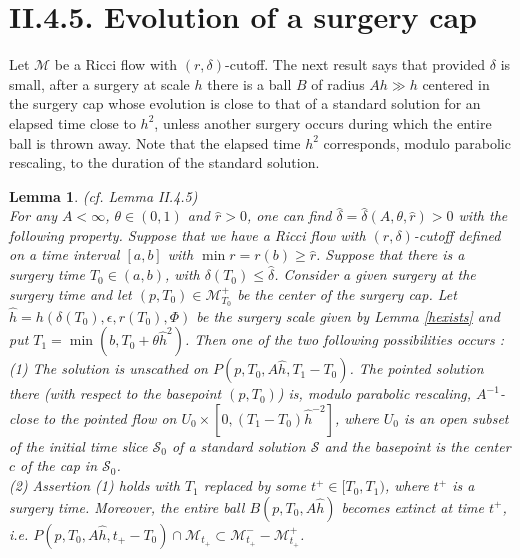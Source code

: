 \documentclass[12pt]{amsart}
\newcommand{\M}{{\mathcal M}}
\newcommand{\s}{{\mathcal S}}
\renewcommand{\th}{\theta}
\newcommand{\de}{\delta}
\newcommand{\eps}{\epsilon}
\numberwithin{equation}{section}
\theoremstyle{plain}
\newtheorem{lemma}[equation]{Lemma}
\theoremstyle{definition}
\theoremstyle{remark}
\begin{document}
\section{II.4.5. Evolution of a surgery cap}
\label{secII.4.5}

Let $\M$ be a Ricci flow with $(r,\de)$-cutoff.
The next result says that provided $\de$ is small,
after a surgery at scale $h$
there is a ball $B$  of radius $Ah\gg h$ centered in the 
surgery cap whose evolution is close to that
of a standard solution for an elapsed time close to $h^2$, 
unless another surgery occurs  during which
the entire ball is thrown away.   Note that the elapsed time $h^2$
corresponds, modulo parabolic rescaling, to the duration
of the standard solution.

\begin{lemma}(cf. Lemma II.4.5)
\label{II.4.5}\\
For any $A<\infty$, $\th\in (0,1)$ and $\hat r>0$, 
one can find $\hat\de=\hat\de(A,\th,\hat r)>0$
with the following property.  Suppose that we
have a Ricci flow with $(r, \de)$-cutoff
defined on a time interval $[a,b]$ with  $\min r=r(b)\geq \hat r$. 
Suppose that there is a surgery time 
$T_0\in (a,b)$, with $\de(T_0)\leq \hat\de$. Consider a given
surgery at the surgery time and let
$(p,T_0)\in\M_{T_0}^+$ 
be the center of the surgery cap.
Let $\hat h= h(\de(T_0),\eps,r(T_0),\Phi)$ be the surgery 
scale given by Lemma \ref{hexists} and put 
$T_1=\min(b,T_0+\th \hat h^2)$.
Then one of the two following possibilities occurs : \\
(1) The solution is unscathed on $P(p,T_0,A\hat h,T_1-T_0)$.
The pointed solution there (with respect to the basepoint
$(p, T_0)$) is, modulo parabolic
rescaling, $A^{-1}$-close to the pointed flow on
$U_0\times [0,(T_1-T_0)\hat h^{-2}]$, where
$U_0$ is an open subset of the initial time slice $\s_0$ 
of a standard solution
$\s$ and the basepoint is
the center $c$ of the cap in $\s_0$. \\
(2) Assertion (1) holds with $T_1$ replaced by some
$t^+ \in [T_0, T_1)$, where $t^+$ is a surgery time. Moreover,
the entire
ball $B(p,T_0,A\hat h)$ becomes extinct at time $t^+$,
i.e. 
$P(p,T_0,A\hat h,t_+-T_0)\cap \M_{t_+}\subset \M_{t_+}^- - \M_{t_+}^+$.
\end{lemma}
\end{document}
